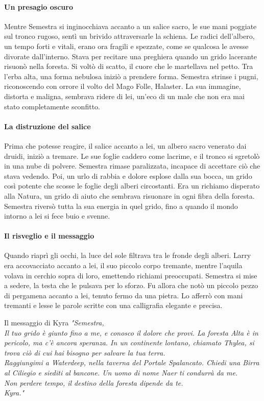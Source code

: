 \documentclass[letterpaper,twocolumn,openany,nodeprecatedcode]{dndbook}
\begin{document}
\paragraph{Un presagio oscuro}  
Mentre Semestra si inginocchiava accanto a un salice sacro, le sue mani poggiate sul tronco rugoso, sentì un brivido attraversarle la schiena. Le radici dell’albero, un tempo forti e vitali, erano ora fragili e spezzate, come se qualcosa le avesse divorate dall’interno. Stava per recitare una preghiera quando un grido lacerante risuonò nella foresta. Si voltò di scatto, il cuore che le martellava nel petto. Tra l’erba alta, una forma nebulosa iniziò a prendere forma. Semestra strinse i pugni, riconoscendo con orrore il volto del Mago Folle, Halaster. La sua immagine, distorta e maligna, sembrava ridere di lei, un’eco di un male che non era mai stato completamente sconfitto.

\paragraph{La distruzione del salice}  
Prima che potesse reagire, il salice accanto a lei, un albero sacro venerato dai druidi, iniziò a tremare. Le sue foglie caddero come lacrime, e il tronco si sgretolò in una nube di polvere. Semestra rimase paralizzata, incapace di accettare ciò che stava vedendo. Poi, un urlo di rabbia e dolore esplose dalla sua bocca, un grido così potente che scosse le foglie degli alberi circostanti. Era un richiamo disperato alla Natura, un grido di aiuto che sembrava risuonare in ogni fibra della foresta. Semestra riversò tutta la sua energia in quel grido, fino a quando il mondo intorno a lei si fece buio e svenne.

\paragraph{Il risveglio e il messaggio}  
Quando riaprì gli occhi, la luce del sole filtrava tra le fronde degli alberi. Larry era accovacciato accanto a lei, il suo piccolo corpo tremante, mentre l’aquila volava in cerchio sopra di loro, emettendo richiami preoccupati. Semestra si mise a sedere, la testa che le pulsava per lo sforzo. Fu allora che notò un piccolo pezzo di pergamena accanto a lei, tenuto fermo da una pietra. Lo afferrò con mani tremanti e lesse le parole scritte con una calligrafia elegante e precisa.

\begin{DndSidebar}[float=!h]{Il messaggio di Kyra}
\textit{
"Semestra,\\
Il tuo grido è giunto fino a me, e conosco il dolore che provi. La foresta Alta è in pericolo, ma c’è ancora speranza. In un continente lontano, chiamato Thylea, si trova ciò di cui hai bisogno per salvare la tua terra.\\  
Raggiungimi a Waterdeep, nella taverna del Portale Spalancato. Chiedi una Birra al Ciliegio e siediti al bancone. Un uomo di nome Naer ti condurrà da me.\\  
Non perdere tempo, il destino della foresta dipende da te.\\  
Kyra."\\
}
\end{DndSidebar}
\end{document}
